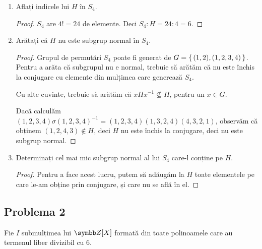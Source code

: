 \begin{enumerate}
    \item Aflați indicele lui \(H\) în \(S_4\).
    \begin{proof}
    \(S_4\) are \(4! = 24\) de elemente. Deci \(S_4 : H = 24 : 4 = 6\).
    \end{proof}

    \item Arătați că \(H\) nu este subgrup normal în \(S_4\).
    \begin{proof}
    Grupul de permutări \(S_4\) poate fi generat de \(G = \set{ (1, 2), (1, 2, 3, 4) }\). Pentru a arăta că subgrupul nu e normal, trebuie să arătăm că nu este închis la conjugare cu elemente din mulțimea care generează \(S_4\).

    Cu alte cuvinte, trebuie să arătăm că \(x H x^{-1} \not\subseteq H\), pentru un \(x \in G\).

    Dacă calculăm \((1, 2, 3, 4) \sigma (1, 2, 3, 4)^{-1} = (1, 2, 3, 4) (1, 3, 2, 4) (4, 3, 2, 1)\), observăm că obținem \((1, 2, 4, 3) \not\in H\), deci \(H\) nu este închis la conjugare, deci nu este subgrup normal.
    \end{proof}

    \item Determinați cel mai mic subgrup normal al lui \(S_4\) care-l conține pe \(H\).
    \begin{proof}
    Pentru a face acest lucru, putem să adăugăm la \(H\) toate elementele pe care le-am obține prin conjugare, și care nu se află în el.
    \end{proof}
\end{enumerate}

\subsection*{Problema 2}

Fie \(I\) submulțimea lui \(\integers[X]\) formată din toate polinoamele care au termenul liber divizibil cu 6.

